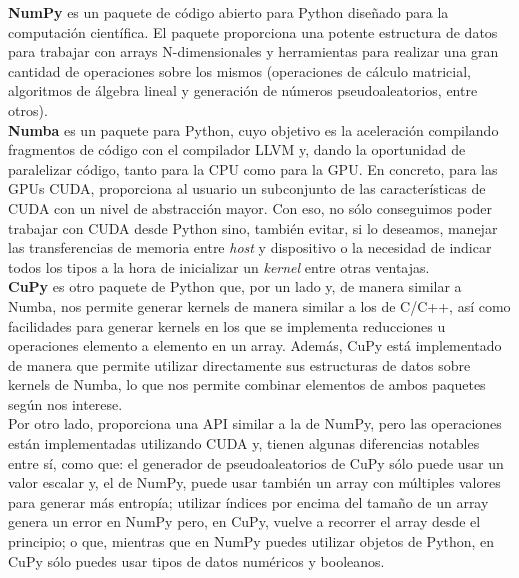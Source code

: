 \textbf{NumPy} \cite{numpy} es un paquete de código abierto para Python diseñado para la computación científica. El paquete proporciona una potente estructura de datos para trabajar con arrays N-dimensionales y herramientas para realizar una gran cantidad de operaciones sobre los mismos (operaciones de cálculo matricial, algoritmos de álgebra lineal y generación de números pseudoaleatorios, entre otros).\\

\textbf{Numba} \cite{numba} es un paquete para Python, cuyo objetivo es la aceleración compilando fragmentos de código con el compilador LLVM y, dando la oportunidad de paralelizar código, tanto para la CPU como para la GPU. En concreto, para las GPUs CUDA, proporciona al usuario un subconjunto de las características de CUDA con un nivel de abstracción mayor. Con eso, no sólo conseguimos poder trabajar con CUDA desde Python sino, también evitar, si lo deseamos, manejar las transferencias de memoria entre \textit{host} y dispositivo o la necesidad de indicar todos los tipos a la hora de inicializar un \textit{kernel} entre otras ventajas.\\

\textbf{CuPy} \cite{cupy} es otro paquete de Python que, por un lado y, de manera similar a Numba, nos permite generar kernels de manera similar a los de C/C++, así como facilidades para generar kernels en los que se implementa reducciones u operaciones elemento a elemento en un array. Además, CuPy está implementado de manera que permite utilizar directamente sus estructuras de datos sobre kernels de Numba, lo que nos permite combinar elementos de ambos paquetes según nos interese. \\

Por otro lado, proporciona una API similar a la de NumPy, pero las operaciones están implementadas utilizando CUDA y, tienen algunas diferencias notables entre sí, como que: el generador de pseudoaleatorios de CuPy sólo puede usar un valor escalar y, el de NumPy, puede usar también un array con múltiples valores para generar más entropía; utilizar índices por encima del tamaño de un array genera un error en NumPy pero, en CuPy, vuelve a recorrer el array desde el principio; o que, mientras que en NumPy puedes utilizar objetos de Python, en CuPy sólo puedes usar tipos de datos numéricos y booleanos.\\

